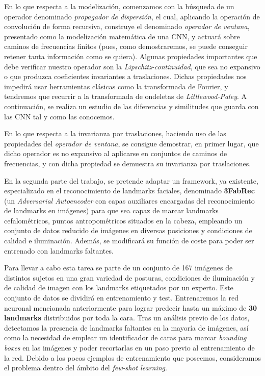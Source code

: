 \noindent En lo que respecta a la modelización, comenzamos con la búsqueda de un operador denominado \textit{propagador de dispersión}, el cual,  aplicando la operación de convolución de forma recursiva, construye el denominado \textit{operador de ventana}, presentado como la modelización matemática de una CNN, y actuará sobre caminos de frecuencias finitos (pues, como demostraremos, se puede conseguir retener tanta información como se quiera). Algunas propiedades importantes que debe verificar nuestro operador son la \textit{Lipschitz-continuidad}, que sea no expansivo o que produzca coeficientes invariantes a traslaciones. Dichas propiedades nos impedirá usar herramientas clásicas como la transformada de Fourier, y tendremos que recurrir a la transformada de ondeletas de \textit{Littlewood-Paley}. A continuación, se realiza un estudio de las diferencias y similitudes que guarda con las CNN tal y como las conocemos.

\medskip

\noindent En lo que respecta a la invarianza por traslaciones, haciendo uso de las propiedades del \textit{operador de ventana}, se consigue demostrar, en primer lugar, que dicho operador es no expansivo al aplicarse en conjuntos de caminos de frecuencias, y con dicha propiedad se demuestra su invarianza por traslaciones.

\medskip

\noindent En la segunda parte del trabajo, se pretende adaptar un framework, ya existente, especializado en el reconocimiento de landmarks faciales, denominado \textbf{3FabRec} (un \textit{Adversarial Autoencoder} con capas auxiliares encargadas del reconocimiento de landmarks en imágenes) para que sea capaz de marcar landmarks cefalométricos, puntos antropométricos situados en la cabeza, empleando un conjunto de datos reducido de imágenes en diversas posiciones y condiciones de calidad e iluminación. Además, se modificará su función de coste para poder ser entrenado con landmarks faltantes.

\medskip

\noindent Para llevar a cabo esta tarea se parte de un conjunto de 167 imágenes de distintos sujetos en una gran variedad de posturas, condiciones de iluminación y de calidad de imagen con los landmarks etiquetados por un experto. Este conjunto de datos se dividirá en entrenamiento y test. Entrenaremos la red neuronal mencionada anteriormente para lograr predecir hasta un máximo de \textbf{30 landmarks} distribuidos por toda la cara. Tras un análisis previo de los datos, detectamos la presencia de landmarks faltantes en la mayoría de imágenes, así como la necesidad de emplear un identificador de caras para marcar \textit{bounding boxes} en las imágenes y poder recortarlas en un paso previo al entrenamiento de la red. Debido a los pocos ejemplos de entrenamiento que poseemos, consideramos el problema dentro del ámbito del \textit{few-shot learning}.

